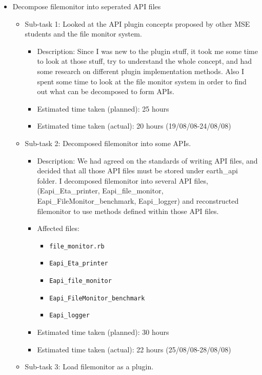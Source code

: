 \documentclass{article}
\begin{document}
\begin{itemize}
	\item Decompose filemonitor into seperated API files
	     \begin{itemize}
	        \item Sub-task 1: Looked at the API plugin concepts proposed by other MSE students and the file monitor system.
	           \begin{itemize}
					\item Description: Since I was new to the plugin stuff, it took me some time to look at those stuff, try to understand the whole concept, and had some research on different plugin implementation methods. Also I spent some time to look at the file monitor system in order to find out what can be decomposed to form APIs.
					\item Estimated time taken (planned): 25 hours
					\item Estimated time taken (actual):  20 hours (19/08/08-24/08/08)
				\end{itemize}
			\item Sub-task 2: Decomposed filemonitor into some APIs.
			   \begin{itemize}
					\item Description: We had agreed on the standards of writing API files, and decided that all those API files must be stored under earth\_api folder. I decomposed filemonitor into several API files,(Eapi\_Eta\_printer, Eapi\_file\_monitor, Eapi\_FileMonitor\_benchmark, Eapi\_logger) and reconstructed filemonitor to use methods defined within those API files.
					\item Affected files: 
					\begin{itemize}
					\item  \texttt{file\_monitor.rb}
					\item  \texttt{Eapi\_Eta\_printer}
					\item  \texttt{Eapi\_file\_monitor}
					\item  \texttt{Eapi\_FileMonitor\_benchmark}
					\item  \texttt{Eapi\_logger}
					\end{itemize}
					\item Estimated time taken (planned): 30 hours
					\item Estimated time taken (actual): 22 hours
					(25/08/08-28/08/08)
				\end{itemize}
			\item Sub-task 3: Load filemonitor as a plugin.
			        \begin{itemize}

\end{itemize}
\end{itemize}
\end{itemize}
\end{document}
